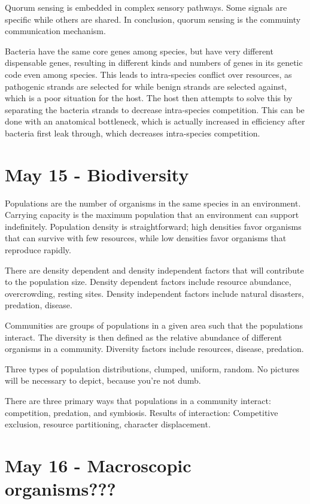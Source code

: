 \documentclass[12pt]{article}
\begin{document}
Quorum sensing is embedded in complex sensory pathways. Some signals are specific while others are shared. In conclusion, quorum sensing is the commuinty communication mechanism.

Bacteria have the same core genes among species, but have very different dispensable genes, resulting in different kinds and numbers of genes in its genetic code even among species. This leads to intra-species conflict over resources, as pathogenic strands are selected for while benign strands are selected against, which is a poor situation for the host. The host then attempts to solve this by separating the bacteria strands to decrease intra-species competition. This can be done with an anatomical bottleneck, which is actually increased in efficiency after bacteria first leak through, which decreases intra-species competition.
\section*{May 15 - Biodiversity}

Populations are the number of organisms in the same species in an environment. Carrying capacity is the maximum population that an environment can support indefinitely. Population density is straightforward; high densities favor organisms that can survive with few resources, while low densities favor organisms that reproduce rapidly.

There are density dependent and density independent factors that will contribute to the population size. Density dependent factors include resource abundance, overcrowding, resting sites. Density independent factors include natural disasters, predation, disease.

Communities are groups of populations in a given area such that the populations interact. The diversity is then defined as the relative abundance of different organisms in a community. Diversity factors include resources, disease, predation.

Three types of population distributions, clumped, uniform, random. No pictures will be necessary to depict, because you're not dumb.

There are three primary ways that populations in a community interact: competition, predation, and symbiosis. Results of interaction: Competitive exclusion, resource partitioning, character displacement.

\section*{May 16 - Macroscopic organisms???}
\end{document}
